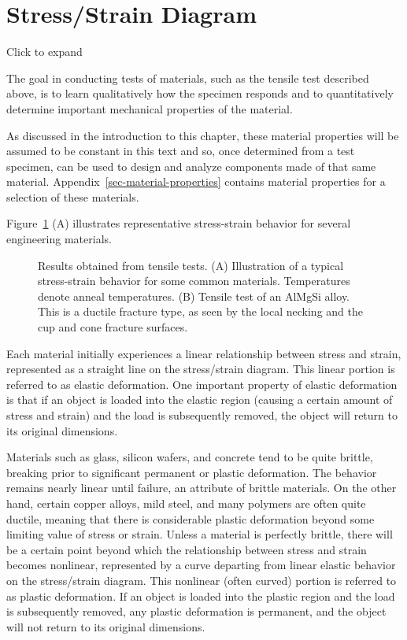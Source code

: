 \documentclass[
  letterpaper,
  DIV=11,
  numbers=noendperiod]{scrreprt}
\theoremstyle{definition}
\theoremstyle{remark}
\begin{document}
\section{Stress/Strain Diagram}\label{sec-4.2}

Click to expand

The goal in conducting tests of materials, such as the tensile test
described above, is to learn qualitatively how the specimen responds and
to quantitatively determine important mechanical properties of the
material.

As discussed in the introduction to this chapter, these material
properties will be assumed to be constant in this text and so, once
determined from a test specimen, can be used to design and analyze
components made of that same material.
Appendix~\ref{sec-material-properties} contains material properties for
a selection of these materials.

Figure~\ref{fig-4.2} (A) illustrates representative stress-strain
behavior for several engineering materials.

\begin{figure}


\caption{\label{fig-4.2}Results obtained from tensile tests. (A)
Illustration of a typical stress-strain behavior for some common
materials. Temperatures denote anneal temperatures. (B) Tensile test of
an AlMgSi alloy. This is a ductile fracture type, as seen by the local
necking and the cup and cone fracture surfaces.}

\end{figure}%

Each material initially experiences a linear relationship between stress
and strain, represented as a straight line on the stress/strain diagram.
This linear portion is referred to as elastic deformation. One important
property of elastic deformation is that if an object is loaded into the
elastic region (causing a certain amount of stress and strain) and the
load is subsequently removed, the object will return to its original
dimensions.

Materials such as glass, silicon wafers, and concrete tend to be quite
brittle, breaking prior to significant permanent or plastic deformation.
The behavior remains nearly linear until failure, an attribute of
brittle materials. On the other hand, certain copper alloys, mild steel,
and many polymers are often quite ductile, meaning that there is
considerable plastic deformation beyond some limiting value of stress or
strain. Unless a material is perfectly brittle, there will be a certain
point beyond which the relationship between stress and strain becomes
nonlinear, represented by a curve departing from linear elastic behavior
on the stress/strain diagram. This nonlinear (often curved) portion is
referred to as plastic deformation. If an object is loaded into the
plastic region and the load is subsequently removed, any plastic
deformation is permanent, and the object will not return to its original
dimensions.
\end{document}
